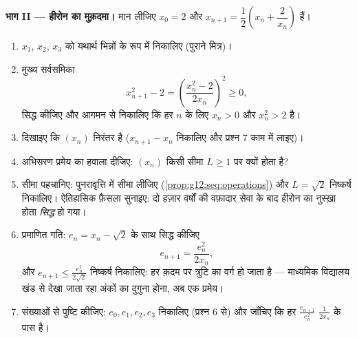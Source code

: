 \begin{problem}
\medskip
\noindent\textbf{भाग II --- हीरोन का मुक़दमा।}
मान लीजिए $x_0 = 2$ और $x_{n+1} = \dfrac12\left(x_n +
\dfrac{2}{x_n}\right)$ हैं।
\begin{enumerate}[resume]
  \item $x_1$, $x_2$, $x_3$ को यथार्थ भिन्नों के रूप में निकालिए (पुराने
        मित्र)।
  \item मुख्य सर्वसमिका
        \[
        x_{n+1}^2 - 2 = \left(\frac{x_n^2 - 2}{2x_n}\right)^{\!2}
        \geq 0,
        \]
        सिद्ध कीजिए और आगमन से निकालिए कि हर $n$ के लिए $x_n > 0$ और $x_n^2 > 2$ है।
  \item दिखाइए कि $(x_n)$ निरंतर  है ($x_{n+1} - x_n$ निकालिए और प्रश्न 7 काम
        में लाइए)।
  \item {} अभिसरण प्रमेय का हवाला दीजिए: $(x_n)$ किसी सीमा $L \geq 1$ पर
         क्यों होता है?
  \item सीमा पहचानिए: पुनरावृत्ति में सीमा लीजिए (\cref{prop:g12:seq:operations}) और $L = \sqrt2$ निष्कर्ष
        निकालिए। ऐतिहासिक फ़ैसला सुनाइए: दो हज़ार वर्षों की वफ़ादार सेवा के
        बाद हीरोन का नुस्ख़ा  होता \emph{सिद्ध} हो गया।
  \item प्रमाणित गति: $e_n = x_n - \sqrt2$ के साथ सिद्ध कीजिए
        \[
        e_{n+1} = \frac{e_n^2}{2 x_n} ,
        \]
        और $e_{n+1} \leq \frac{e_n^2}{2\sqrt2}$ निष्कर्ष निकालिए: हर क़दम पर त्रुटि का वर्ग हो जाता है ---
        माध्यमिक विद्यालय खंड से देखा जाता रहा अंकों का दुगुना होना, अब एक
        प्रमेय।
  \item संख्याओं से पुष्टि कीजिए: $e_0, e_1, e_2, e_3$ निकालिए (प्रश्न 6 से) और जाँचिए कि
        हर $\frac{e_{n+1}}{e_n^2}$ $\frac{1}{2x_n}$ के पास है।
\end{enumerate}


\end{problem}

